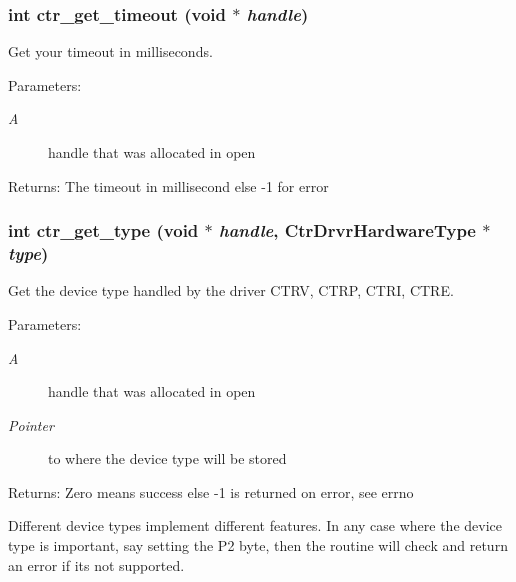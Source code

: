 \subsubsection{\setlength{\rightskip}{0pt plus 5cm}int ctr\_\-get\_\-timeout (void $\ast$ {\em handle})}\label{libctr_8doxygen_5f823ac1692921cbf9eb23664b9e498b}


Get your timeout in milliseconds. 

\begin{Desc}
\item[Parameters:]
\begin{description}
\item[{\em A}]handle that was allocated in open \end{description}
\end{Desc}
\begin{Desc}
\item[Returns:]The timeout in millisecond else -1 for error \end{Desc}
\subsubsection{\setlength{\rightskip}{0pt plus 5cm}int ctr\_\-get\_\-type (void $\ast$ {\em handle}, Ctr\-Drvr\-Hardware\-Type $\ast$ {\em type})}\label{libctr_8doxygen_e040fbe9bde17bf241023c8cf3f4a2e6}


Get the device type handled by the driver CTRV, CTRP, CTRI, CTRE. 

\begin{Desc}
\item[Parameters:]
\begin{description}
\item[{\em A}]handle that was allocated in open \item[{\em Pointer}]to where the device type will be stored \end{description}
\end{Desc}
\begin{Desc}
\item[Returns:]Zero means success else -1 is returned on error, see errno\end{Desc}
Different device types implement different features. In any case where the device type is important, say setting the P2 byte, then the routine will check and return an error if its not supported. 
